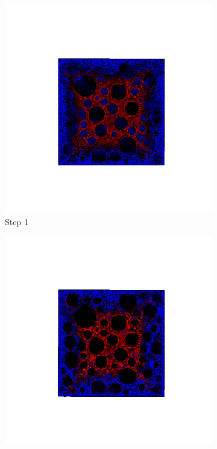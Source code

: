   \begin{figure}[ht!]
  \centering
      \begin{subfigure}{.25\textwidth}
        \centering
        \includegraphics[width=1.0\linewidth]{Files/A30X0C_3_IS/DEP50-STEP(001).png}
      \caption{Step 1}
      \end{subfigure}%
      \begin{subfigure}{.25\textwidth}
        \centering
        \includegraphics[width=1.0\linewidth]{Files/A30X0C_3_IS/DEP50-STEP(002).png}

\end{subfigure}
\end{figure}
